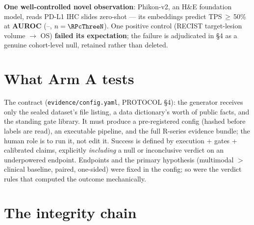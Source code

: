 \documentclass[11pt,a4paper]{article}
\begin{document}
\textbf{One well-controlled novel observation}: Phikon-v2, an H\&E foundation model, reads
PD-L1 IHC slides zero-shot --- its embeddings predict TPS\,$\geq$\,50\% at
\textbf{AUROC \RPcThreeAuroc} (\RPcThreeLo--\RPcThreeHi, $n=\RPcThreeN$). One positive
control (RECIST target-lesion volume $\rightarrow$ OS) \textbf{failed its expectation}; the
failure is adjudicated in \S4 as a genuine cohort-level null, retained rather than deleted.

\section{What Arm A tests}

The contract (\texttt{evidence/config.yaml}, PROTOCOL \S4): the generator receives only the
sealed dataset's file listing, a data dictionary's worth of public facts, and the standing gate
library. It must produce a pre-registered config (hashed before labels are read), an executable
pipeline, and the full R-series evidence bundle; the human role is to run it, not edit it.
Success is defined by execution + gates + calibrated claims, explicitly \emph{including} a
null or inconclusive verdict on an underpowered endpoint. Endpoints and the primary hypothesis
(multimodal $>$ clinical baseline, paired, one-sided) were fixed in the config; so were the
verdict rules that computed the \RVerdict{} outcome mechanically.

\section{The integrity chain}
\end{document}
